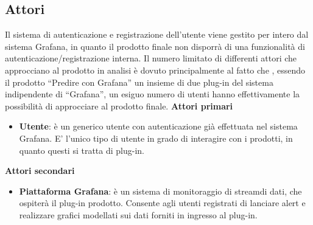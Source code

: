 	\subsection{Attori}
Il sistema di autenticazione e registrazione dell’utente viene gestito per intero dal sistema Grafana, in quanto il prodotto finale non disporrà di una funzionalità di autenticazione/registrazione interna.
Il numero limitato di differenti  attori che approcciano al prodotto in analisi è dovuto principalmente  al fatto che , essendo il prodotto “Predire con Grafana” un insieme di due plug-in del sistema indipendente di “Grafana”, un esiguo numero di utenti hanno effettivamente la possibilità di approcciare al prodotto finale.
\textbf{Attori primari}
	\begin{itemize}
		\item\textbf{Utente}: è un generico utente con autenticazione già effettuata nel sistema Grafana. E’ l’unico tipo di utente in grado di interagire con i prodotti, in quanto questi si tratta di plug-in.

 	\end{itemize}
\textbf{Attori secondari}
	\begin{itemize}
		\item\textbf{Piattaforma Grafana}: è un sistema di monitoraggio di stream\glo di dati, che ospiterà il plug-in prodotto. Consente agli utenti registrati di lanciare alert e realizzare grafici modellati sui dati forniti in ingresso al plug-in.
 	\end{itemize}